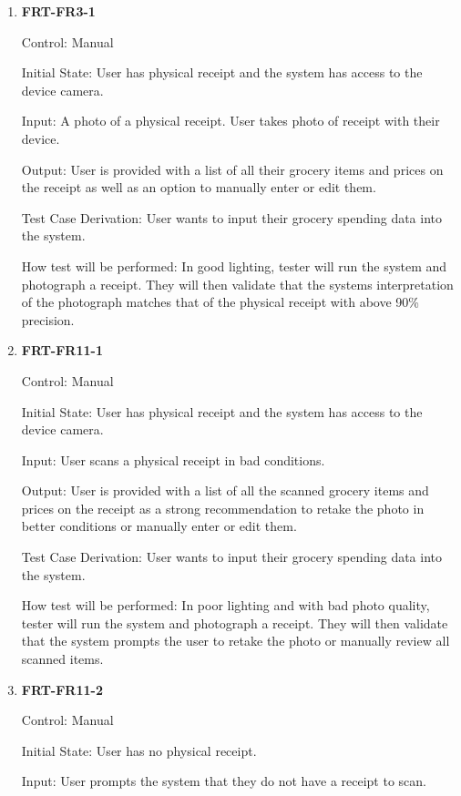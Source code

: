 \documentclass[12pt, titlepage]{article}
\begin{document}
\begin{enumerate}

\item{\textbf{FRT-FR3-1}}

Control: Manual
          
Initial State: User has physical receipt and the system has access to the device camera.
          
Input: A photo of a physical receipt. User takes photo of receipt with their device.
          
Output: User is provided with a list of all their grocery items and prices on the receipt as well as an option to manually enter or edit them.

Test Case Derivation: User wants to input their grocery spending data into the system.
          
How test will be performed: In good lighting, tester will run the system and photograph a receipt. They will then validate that the systems interpretation of the photograph matches that of the physical receipt with above 90\% precision.

\item{\textbf{FRT-FR11-1}}

Control: Manual
          
Initial State: User has physical receipt and the system has access to the device camera.

Input: User scans a physical receipt in bad conditions.
          
Output: User is provided with a list of all the scanned grocery items and prices on the receipt as a strong recommendation to retake the photo in better conditions or manually enter or edit them.

Test Case Derivation: User wants to input their grocery spending data into the system.
          
How test will be performed: In poor lighting and with bad photo quality, tester will run the system and photograph a receipt. They will then validate that the system prompts the user to retake the photo or manually review all scanned items.

\item{\textbf{FRT-FR11-2}}

Control: Manual
          
Initial State: User has no physical receipt.

Input: User prompts the system that they do not have a receipt to scan.
          

\end{enumerate}
\end{document}
